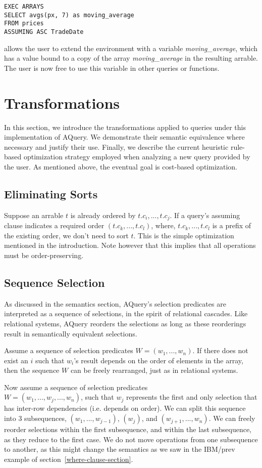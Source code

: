 \documentclass{acm_proc_article-sp}
\begin{document}
\begin{lstlisting}
EXEC ARRAYS 
SELECT avgs(px, 7) as moving_average 
FROM prices
ASSUMING ASC TradeDate
\end{lstlisting}

allows the user to extend the environment with a variable \textit{moving\_average}, which has a value bound to a copy of the array \textit{moving\_average} in the resulting arrable. The user is now free to use this variable in other queries or functions.


\section{Transformations}
In this section, we introduce the transformations applied to queries under this implementation of AQuery. We demonstrate their semantic equivalence where necessary and justify their use. Finally, we describe the current heuristic rule-based optimization strategy employed  when analyzing a new query provided by the user. As mentioned above, the eventual goal is cost-based optimization.

\subsection{Eliminating Sorts}
Suppose an arrable $t$ is already ordered by $t.c_i, ..., t.c_j$. If a query's assuming clause indicates a required order $(t.c_k, ... , t.c_l)$, where, $t.c_k, ..., t.c_l$ is a prefix of the existing order, we don't need to sort $t$.
This is the simple optimization mentioned in the introduction.
Note however that this implies that all operations must be order-preserving.

\subsection{Sequence Selection}
As discussed in the semantics section,
AQuery's selection predicates are interpreted as a sequence of selections, in the spirit of relational cascades\cite{elmasri2014fundamentals}. Like relational systems, AQuery reorders the selections as long as these reorderings result in semantically equivalent selections.

Assume a sequence of selection predicates $W = (w_1, ..., w_n)$. If there does not exist an $i$ such that $w_i$'s result depends on the order of elements in the array, then the sequence $W$ can be freely rearranged, just as in relational systems. 

Now assume a sequence of selection predicates\\ 
$W = (w_1, ..., w_j, ..., w_n)$, such that $w_j$ represents the first and only selection that has inter-row dependencies (i.e. depends on order). We can split this sequence into 3 subsequences, $(w_1, ..., w_{j-1})$, $(w_j)$, and $(w_{j+1}, ...,w_n)$. We can freely reorder selections within the first subsequence, and within the last subsequence, as they reduce to the first case. 
We do not move operations from one subsequence to another, as this
might change the semantics as we saw in the IBM/prev example of
section~\ref{where-clause-section}.
\end{document}
